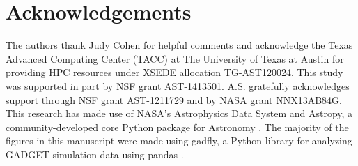 \section*{Acknowledgements}
The authors thank Judy Cohen for helpful comments and acknowledge the Texas Advanced Computing Center (TACC) at The University of Texas at Austin for providing HPC resources under XSEDE allocation TG-AST120024. This study was supported in part by NSF grant AST-1413501. A.S. gratefully acknowledges support through NSF grant AST-1211729 and by NASA grant NNX13AB84G. This research has made use of NASA's Astrophysics Data System and Astropy, a community-developed core Python package for Astronomy \citep{Robitailleetal2013}. The majority of the figures in this manuscript were made using gadfly, a Python library for analyzing GADGET simulation data using pandas \citep{Hummel2016}.